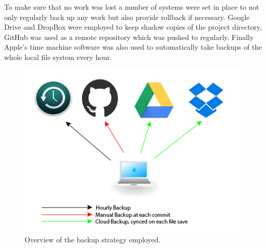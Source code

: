 \documentclass[12pt,twoside,notitlepage]{report}
\begin{document}
            To make sure that no work was lost a number of systems were set in place to not only regularly back up 
            any work but also provide rollback if necessary. Google Drive and DropBox were employed to keep shadow 
            copies of the project directory, GitHub was used as a remote repository which was pushed to regularly. 
            Finally Apple's time machine software was also used to automatically take backups of the whole local 
            file system every hour.

            \begin{figure}[H]
                \centering
                \includegraphics[scale=0.75]{backup_plan}
                \caption[Overview of the backup strategy employed.]{Overview of the backup strategy employed\footnotemark.}
            \end{figure}






\cleardoublepage
\end{document}
